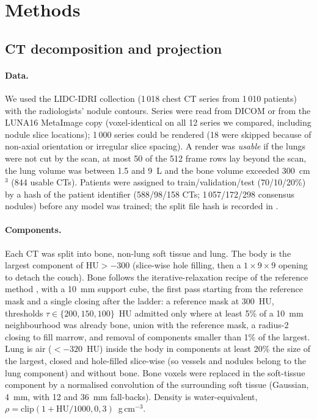 \section{Methods}
\label{sec:methods}

\subsection{CT decomposition and projection}
\paragraph{Data.} We used the LIDC-IDRI collection (1\,018 chest CT series from 1\,010 patients) with the radiologists' nodule contours.
Series were read from DICOM or from the LUNA16 MetaImage copy (voxel-identical on all 12 series we compared, including nodule slice locations); 1\,000 series
could be rendered (18 were skipped because of non-axial orientation or irregular slice spacing). A render was \emph{usable} if the lungs were not cut by the
scan, at most 50 of the 512 frame rows lay beyond the scan, the lung volume was between 1.5 and 9~L and the bone volume exceeded 300~cm$^3$
(844 usable CTs). Patients were assigned to train/validation/test (70/10/20\%) by a hash of the patient identifier (588/98/158 CTs; 1\,057/172/298
consensus nodules) before any model was trained; the split file hash is recorded in .

\paragraph{Components.} Each CT was split into bone, non-lung soft tissue and lung. The body is the largest component of $\mathrm{HU}>-300$
(slice-wise hole filling, then a $1{\times}9{\times}9$ opening to detach the couch). Bone follows the iterative-relaxation recipe of the reference method \citep[Algorithm~1]{angaitkar2026anatomy}, with a 10~mm support cube,
the first pass starting from the reference mask and a single closing after the ladder:
a reference mask at 300~HU, thresholds $\tau\in\{200,150,100\}$~HU admitted only where at least 5\% of a 10~mm neighbourhood was already bone, union with the
reference mask, a radius-2 closing to fill marrow, and removal of components smaller than 1\% of the largest. Lung is air ($<-320$~HU) inside the body in
components at least 20\% the size of the largest, closed and hole-filled slice-wise (so vessels and nodules belong to the lung component) and
without bone. Bone voxels were replaced in the soft-tissue component by a normalised convolution of the surrounding soft tissue (Gaussian, 4~mm, with
12 and 36~mm fall-backs). Density is water-equivalent, $\rho=\mathrm{clip}(1+\mathrm{HU}/1000,0,3)$~g\,cm$^{-3}$.


